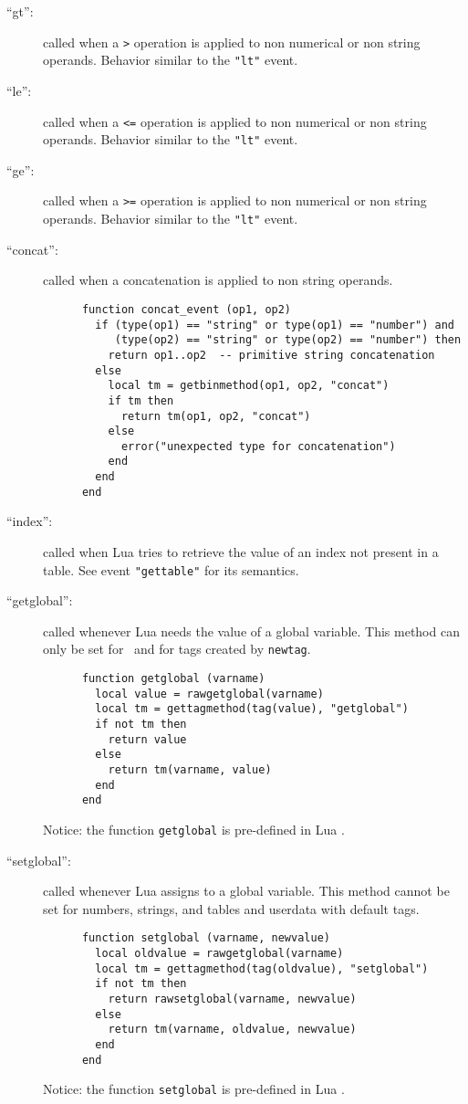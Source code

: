\begin{description}
\item[``gt'':]
called when a \verb|>| operation is applied to non numerical
or non string operands.
Behavior similar to the \verb|"lt"| event.

\item[``le'':]
called when a \verb|<=| operation is applied to non numerical
or non string operands.
Behavior similar to the \verb|"lt"| event.

\item[``ge'':]
called when a \verb|>=| operation is applied to non numerical
or non string operands.
Behavior similar to the \verb|"lt"| event.

\item[``concat'':]
called when a concatenation is applied to non string operands.
\begin{verbatim}
      function concat_event (op1, op2)
        if (type(op1) == "string" or type(op1) == "number") and
           (type(op2) == "string" or type(op2) == "number") then
          return op1..op2  -- primitive string concatenation
        else
          local tm = getbinmethod(op1, op2, "concat")
          if tm then
            return tm(op1, op2, "concat")
          else
            error("unexpected type for concatenation")
          end
        end
      end
\end{verbatim}

\item[``index'':]
called when Lua tries to retrieve the value of an index
not present in a table.
See event \verb|"gettable"| for its semantics.

\item[``getglobal'':]
called whenever Lua needs the value of a global variable.
This method can only be set for \nil\ and for tags
created by \verb|newtag|.
\begin{verbatim}
      function getglobal (varname)
        local value = rawgetglobal(varname)
        local tm = gettagmethod(tag(value), "getglobal")
        if not tm then
          return value
        else
          return tm(varname, value)
        end
      end
\end{verbatim}
Notice: the function \verb|getglobal| is pre-defined in Lua .

\item[``setglobal'':]
called whenever Lua assigns to a global variable.
This method cannot be set for numbers, strings, and tables and
userdata with default tags.
\begin{verbatim}
      function setglobal (varname, newvalue)
        local oldvalue = rawgetglobal(varname)
        local tm = gettagmethod(tag(oldvalue), "setglobal")
        if not tm then
          return rawsetglobal(varname, newvalue)
        else
          return tm(varname, oldvalue, newvalue)
        end
      end
\end{verbatim}
Notice: the function \verb|setglobal| is pre-defined in Lua .


\end{description}
